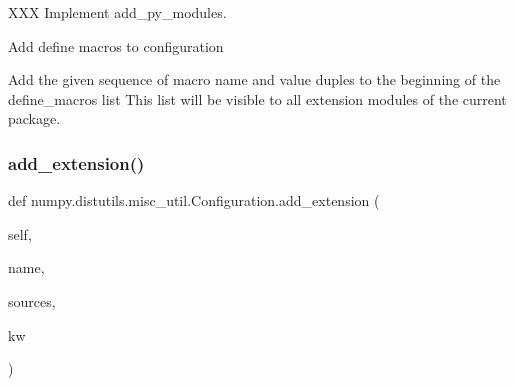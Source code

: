 X\+XX Implement add\+\_\+py\+\_\+modules. 

\begin{DoxyVerb}Add define macros to configuration

Add the given sequence of macro name and value duples to the beginning
of the define_macros list This list will be visible to all extension
modules of the current package.
\end{DoxyVerb}
 \mbox{\label{classnumpy_1_1distutils_1_1misc__util_1_1Configuration_a3082c3f24bbe88c9d4d4155f83125a79}} 
\subsubsection{\texorpdfstring{add\+\_\+extension()}{add\_extension()}}
{\footnotesize\ttfamily def numpy.\+distutils.\+misc\+\_\+util.\+Configuration.\+add\+\_\+extension (\begin{DoxyParamCaption}\item[{}]{self,  }\item[{}]{name,  }\item[{}]{sources,  }\item[{}]{kw }\end{DoxyParamCaption})}

